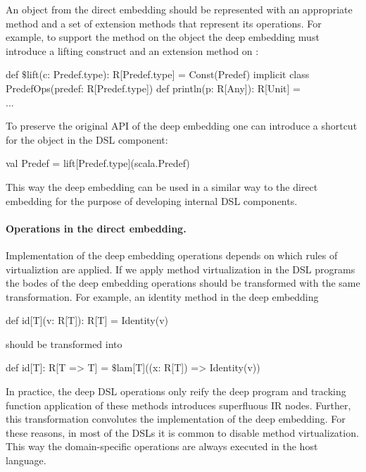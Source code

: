 An object from the direct embedding should be represented with an appropriate  method and a set
 of extension methods that represent its operations. For example, to support the 
 method on the  object the deep embedding must introduce a lifting construct and
 an extension method on :\begin{lstparagraph}
 def $\$$lift(c: Predef.type): R[Predef.type] = Const(Predef)
 implicit class PredefOps(predef: R[Predef.type]) {
   def println(p: R[Any]): R[Unit] = \\...
 }
 \end{lstparagraph}

To preserve the original API of the deep embedding one can introduce a shortcut for the
  object in the DSL component:\begin{lstparagraph}
 val Predef = lift[Predef.type](scala.Predef)
\end{lstparagraph}
This way the deep embedding can be used in a similar way to the direct embedding for
 the purpose of developing internal DSL components.


\paragraph{Operations in the direct embedding.} Implementation of the deep embedding operations
 depends on which rules of virtualiztion are applied. If we apply method virtualization
 in the DSL programs the bodes of the deep embedding operations should be transformed
 with the same transformation. For example, an identity method
 in the deep embedding\begin{lstparagraph}
   def id[T](v: R[T]): R[T] = Identity(v)
 \end{lstparagraph}
 should be transformed into\begin{lstparagraph}
   def id[T]: R[T => T] = $\$$lam[T]((x: R[T]) => Identity(v))
 \end{lstparagraph}

In practice, the deep DSL operations only reify the deep program and tracking function application of these
 methods introduces superfluous IR nodes. Further, this transformation convolutes
 the implementation of the deep embedding. For these reasons, in most of the DSLs it is common to disable method
 virtualization. This way the domain-specific operations are always executed in
 the host language.


